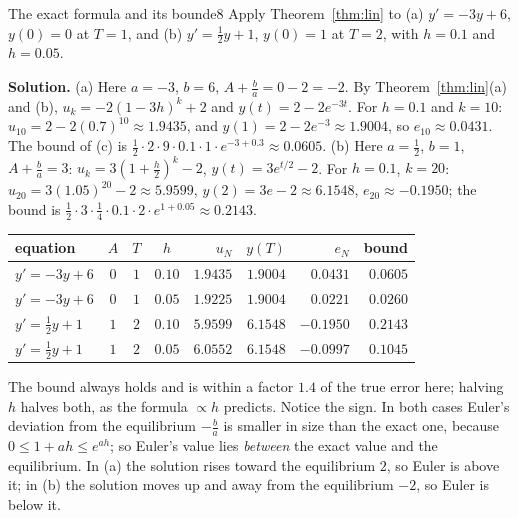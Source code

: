 \documentclass[11pt]{article}
\begin{document}
\begin{exmp}{The exact formula and its bound}{e8}
Apply Theorem~\ref{thm:lin} to (a) $y'=-3y+6$, $y(0)=0$ at $T=1$, and (b) $y'=\frac12y+1$, $y(0)=1$ at $T=2$, with $h=0.1$ and $h=0.05$.

\textbf{Solution.} (a) Here $a=-3$, $b=6$, $A+\frac ba=0-2=-2$. By Theorem~\ref{thm:lin}(a) and (b), $u_k=-2(1-3h)^k+2$ and $y(t)=2-2e^{-3t}$. For $h=0.1$ and $k=10$: $u_{10}=2-2(0.7)^{10}\approx1.9435$, and $y(1)=2-2e^{-3}\approx1.9004$, so $e_{10}\approx0.0431$. The bound of (c) is $\frac12\cdot2\cdot9\cdot0.1\cdot1\cdot e^{-3+0.3}\approx0.0605$. (b) Here $a=\frac12$, $b=1$, $A+\frac ba=3$: $u_k=3(1+\frac h2)^k-2$, $y(t)=3e^{t/2}-2$. For $h=0.1$, $k=20$: $u_{20}=3(1.05)^{20}-2\approx5.9599$, $y(2)=3e-2\approx6.1548$, $e_{20}\approx-0.1950$; the bound is $\frac12\cdot3\cdot\frac14\cdot0.1\cdot2\cdot e^{1+0.05}\approx0.2143$.
\begin{center}
\begin{tabular}{lcccrrrr}
\toprule equation & $A$ & $T$ & $h$ & $u_N$ & $y(T)$ & $e_N$ & bound \\\midrule
$y'=-3y+6$ & $0$ & $1$ & $0.10$ & $1.9435$ & $1.9004$ & $0.0431$ & $0.0605$\\
$y'=-3y+6$ & $0$ & $1$ & $0.05$ & $1.9225$ & $1.9004$ & $0.0221$ & $0.0260$\\
$y'=\frac12y+1$ & $1$ & $2$ & $0.10$ & $5.9599$ & $6.1548$ & $-0.1950$ & $0.2143$\\
$y'=\frac12y+1$ & $1$ & $2$ & $0.05$ & $6.0552$ & $6.1548$ & $-0.0997$ & $0.1045$\\
\bottomrule
\end{tabular}
\end{center}
The bound always holds and is within a factor $1.4$ of the true error here; halving $h$ halves both, as the formula $\propto h$ predicts. Notice the sign. In both cases Euler's deviation from the equilibrium $-\frac ba$ is smaller in size than the exact one, because $0\le1+ah\le e^{ah}$; so Euler's value lies \emph{between} the exact value and the equilibrium. In (a) the solution rises toward the equilibrium $2$, so Euler is above it; in (b) the solution moves up and away from the equilibrium $-2$, so Euler is below it.
\end{exmp}
\end{document}

